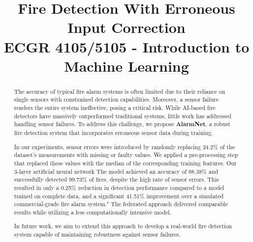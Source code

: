 \documentclass[conference]{IEEEtran}
\begin{document}
\title{ Fire Detection With Erroneous Input Correction\\
        { \footnotesize ECGR 4105/5105 - Introduction to
            Machine Learning} }

\author{ 
\and
{}
\and
{}
 }
\maketitle

\begin{abstract}
The accuracy of typical fire alarm systems is often limited
due to their reliance on single sensors with constrained
detection capabilities. Moreover, a sensor failure renders
the entire system ineffective, posing a critical risk. While
AI-based fire detectors have massively outperformed
traditional systems, little work has addressed handling
sensor failures. To address this challenge, we propose
\textbf{AlarmNet}, a robust fire detection system that
incorporates erroneous sensor data during training. 

In our experiments, sensor errors were introduced by
randomly replacing 24.2\% of the dataset’s measurements with
missing or faulty values. We applied a pre-processing step
that replaced these values with the median of the
corresponding training features. Our 3-layer artificial
neural network The model achieved an accuracy of 98.38\% and
successfully detected 99.73\% of fires, despite the high
rate of sensor errors. This resulted in only a 0.25\%
reduction in detection performance compared to a model
trained on complete data, and a significant 41.51\%
improvement over a simulated commercial-grade fire alarm
system." The federated approach delivered comparable results
while utilizing a less computationally intensive model.

In future work, we aim to extend this approach to develop a
real-world fire detection system capable of maintaining
robustness against sensor failures.
\end{abstract}
\end{document}
